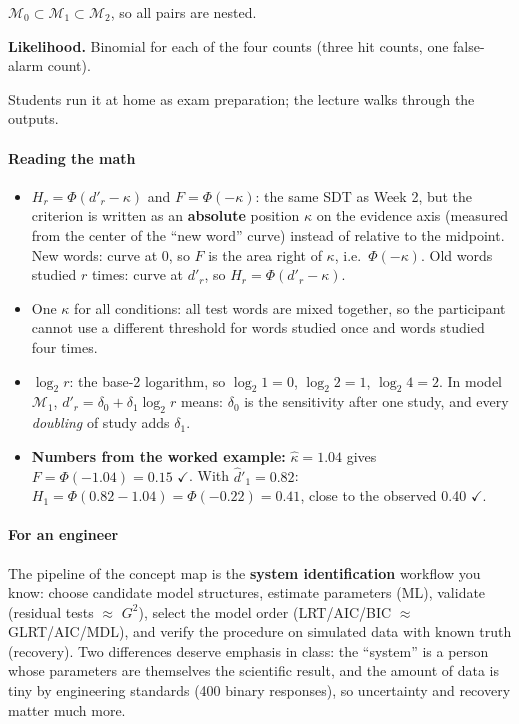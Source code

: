 \(\mathcal{M}_0 \subset \mathcal{M}_1 \subset \mathcal{M}_2\), so all
pairs are nested.

\textbf{Likelihood.} Binomial for each of the four counts (three hit
counts, one false-alarm count).

Students run it at home as exam preparation; the lecture walks through
the outputs.

\paragraph{Reading the math}

\begin{itemize}
\tightlist
\item
  \(H_r = \Phi(d'_r - \kappa)\) and \(F = \Phi(-\kappa)\): the same SDT
  as Week 2, but the criterion is written as an \textbf{absolute}
  position \(\kappa\) on the evidence axis (measured from the center of
  the ``new word'' curve) instead of relative to the midpoint. New
  words: curve at 0, so \(F\) is the area right of \(\kappa\),
  i.e.~\(\Phi(-\kappa)\). Old words studied \(r\) times: curve at
  \(d'_r\), so \(H_r = \Phi(d'_r - \kappa)\).
\item
  One \(\kappa\) for all conditions: all test words are mixed together,
  so the participant cannot use a different threshold for words studied
  once and words studied four times.
\item
  \(\log_2 r\): the base-2 logarithm, so \(\log_2 1 = 0\),
  \(\log_2 2 = 1\), \(\log_2 4 = 2\). In model \(\mathcal{M}_1\),
  \(d'_r = \delta_0 + \delta_1\log_2 r\) means: \(\delta_0\) is the
  sensitivity after one study, and every \emph{doubling} of study adds
  \(\delta_1\).
\item
  \textbf{Numbers from the worked example:} \(\hat\kappa = 1.04\) gives
  \(F = \Phi(-1.04) = 0.15\) \ensuremath{\checkmark}. With \(\hat d'_1 = 0.82\):
  \(H_1 = \Phi(0.82 - 1.04) = \Phi(-0.22) = 0.41\), close to the
  observed 0.40 \ensuremath{\checkmark}.
\end{itemize}

\paragraph{For an engineer}

The pipeline of the concept map is the \textbf{system identification}
workflow you know: choose candidate model structures, estimate
parameters (ML), validate (residual tests \ensuremath{\approx} \(G^2\)), select the model
order (LRT/AIC/BIC \ensuremath{\approx} GLRT/AIC/MDL), and verify the procedure on
simulated data with known truth (recovery). Two differences deserve
emphasis in class: the ``system'' is a person whose parameters are
themselves the scientific result, and the amount of data is tiny by
engineering standards (400 binary responses), so uncertainty and
recovery matter much more.

